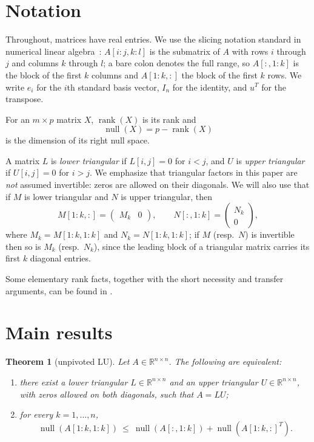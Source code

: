 \documentclass[preprint,12pt]{elsarticle}
\theoremstyle{plain}
\newtheorem{theorem}{Theorem}
\theoremstyle{nonumberplain}
\numberwithin{equation}{section}
\DeclareMathOperator{\rk}{rank}
\DeclareMathOperator{\nl}{null}
\newcommand{\by}{\times}
\numberwithin{theorem}{section}
\begin{document}
\section{Notation}\label{sec:notation}

Throughout, matrices have real entries.  We use the slicing notation standard in numerical linear algebra~\cite{golub_matrix_2013}: $A[i:j, k:l]$ is the submatrix of $A$ with rows $i$ through $j$ and columns $k$ through $l$; a bare colon denotes the full range, so $A[:,1:k]$ is the block of the first $k$ columns and $A[1:k,:]$ the block of the first $k$ rows.  We write $e_i$ for the $i$th standard basis vector, $I_n$ for the identity, and $u^T$ for the transpose.

For an $m \by p$ matrix $X$, $\rk(X)$ is its rank and
\[
  \nl(X) = p - \rk(X)
\]
is the dimension of its right null space.

A matrix $L$ is \emph{lower triangular} if $L[i,j] = 0$ for $i < j$, and $U$ is \emph{upper triangular} if $U[i,j] = 0$ for $i > j$.  We emphasize that triangular factors in this paper are \emph{not} assumed invertible: zeros are allowed on their diagonals.  We will also use that if $M$ is lower triangular and $N$ is upper triangular, then
\begin{equation}\label{eq:tri-slices}
  M[1:k,:] =
  \begin{pmatrix}
    M_k & 0
  \end{pmatrix},
  \qquad
  N[:,1:k] =
  \begin{pmatrix}
    N_k \\ 0
  \end{pmatrix},
\end{equation}
where $M_k = M[1:k,1:k]$ and $N_k = N[1:k,1:k]$; if $M$ (resp.\ $N$) is invertible then so is $M_k$ (resp.\ $N_k$), since the leading block of a triangular matrix carries its first $k$ diagonal entries.

Some elementary rank facts, together with the short necessity and transfer arguments, can be found in .

\section{Main results}\label{sec:results}

\begin{theorem}[unpivoted LU]\label{thm:lu}
  Let $A \in \mathbb{R}^{n \by n}$.  The following are equivalent:
  \begin{enumerate}
    \item there exist a lower triangular $L \in \mathbb{R}^{n \by n}$ and an upper
      triangular $U \in \mathbb{R}^{n \by n}$, with zeros allowed on both diagonals,
      such that $A = LU$;
    \item for every $k = 1, \ldots, n$,
      \begin{equation}\label{eq:lu-crit}
        \nl(A[1:k,1:k]) \ \le\ \nl(A[:,1:k]) + \nl({A[1:k,:]}^T) .
      \end{equation}
  \end{enumerate}
\end{theorem}
\end{document}
